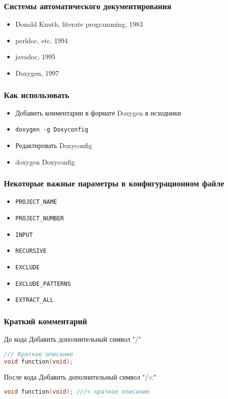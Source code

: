 \begin{frame}
 \frametitle{Системы автоматического документирования}
 \begin{itemize}
  \item Donald Knuth, literate programming, 1983
  \item perldoc, etc. 1994
  \item javadoc, 1995
  \item Doxygen, 1997
 \end{itemize}
\end{frame}

\begin{frame}
 \frametitle{Как использовать}
 \begin{itemize}
  \item Добавить комментарии в формате Doxygen в исходники
  \item \texttt{doxygen -g Doxyconfig}
  \item Редактировать Doxyconfig
  \item doxygen Doxyconfig
 \end{itemize}
\end{frame}


\begin{frame}[fragile]
 \frametitle{Некоторые важные параметры в конфигурационном файле}
 \begin{itemize}
  \item \verb+PROJECT_NAME+
  \item \verb+PROJECT_NUMBER+
  \item \verb+INPUT+  
  \item \verb+RECURSIVE+
  \item \verb+EXCLUDE+
  \item \verb+EXCLUDE_PATTERNS+
  \item \verb+EXTRACT_ALL+
 \end{itemize}
\end{frame}

\begin{frame}[fragile]
 \frametitle{Краткий комментарий}
 \begin{block}{До кода}
   Добавить дополнительный символ "/"
   \begin{lstlisting}[language=C]
/// Краткое описание
void function(void);
\end{lstlisting}
 \end{block}
 \begin{block}{После кода}
   Добавить дополнительный символ "/<"
   \begin{lstlisting}[language=C]
void function(void); ///< краткое описание
\end{lstlisting}
 \end{block}
\end{frame}

